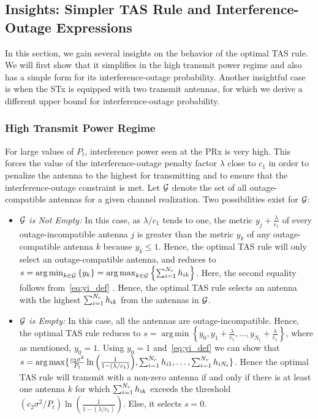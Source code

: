 \documentclass[12pt,draftcls,peerreview,onecolumn]{IEEEtran}
\DeclareMathOperator*{\argmin}{arg\,min}
\DeclareMathOperator*{\argmax}{arg\,max}
\newcommand{\lam}{\lambda}
\newcommand{\goodset}{\cal{G}}
\newcommand{\Nt}{{N_t}}
\newcommand{\Pt}{{P_t}}
\newcommand{\such}{h}
\newcommand{\hk}[1]{{\such_{#1}}}
\newcommand{\noisevar}{\sigma^2}
\newcommand{\cone}{c_{1}}
\newcommand{\ctwo}{c_{2}}
\newcommand{\m}{\cone}
\newcommand{\lambym}{\frac{\lam}{\m}}
\newcommand{\yk}[1]{y_{#1}}
\newcommand{\ykplambym}[1]{\yk{#1}+\lambym}
\newcommand{\al}{\ctwo}
\newcommand{\igamma}{{\frac{\al\noisevar}{\Pt}\ln\left(\frac{1}{1-\left(\lam/\m\right) }\right)}}
\newcommand{\igammainline}{{\left( {\al\noisevar}/{\Pt}\right) \ln\left(\frac{1}{1-\left(\lam/\m\right) }\right)}}
\begin{document}
%
%

\subsection{Insights: Simpler TAS Rule and Interference-Outage Expressions}
In this section, we gain several insights on the behavior of the optimal TAS rule. We will first show that it simplifies in the high transmit power regime and also has a simple form for its interference-outage probability. Another insightful case is when the STx is equipped with two transmit antennas, for which we derive a different upper bound for interference-outage probability.  
%
\subsubsection{High Transmit Power Regime}
\label{sec:high_power}
For large values of $\Pt$, interference power seen at the PRx is very high. This forces the value of the interference-outage penalty factor $\lam$ close to $\cone$ in order to penalize the antenna to the highest for transmitting and to ensure that the interference-outage constraint is met. Let $\goodset$ denote the set of all outage-compatible antennas for a given channel realization. Two possibilities exist for $\goodset$: 

\begin{itemize}
	\item {\em $\goodset$ is Not Empty:} In this case, as $\lam/\m$ tends to one, the metric $\ykplambym{j}$ of every outage-incompatible antenna $j$ is greater than the metric $\yk{k}$ of any outage-compatible antenna $k$ because $\yk{k}\leq 1$. Hence, the optimal TAS rule will only select an outage-compatible antenna, and  reduces to $s=\argmin_{k\in\goodset} \left\{ \yk{k} \right\} = \argmax_{k\in\goodset} \left\{ \sumnr \hk{ik} \right\}$. Here, the second equality follows from~\eqref{eq:yi_def} . Hence, the optimal TAS rule selects an antenna with the highest $\sumnr \hk{ik}$ from the antennas in $\goodset$. 
	
	\item {\em $\goodset$ is Empty:} In this case, all the antennas are outage-incompatible. Hence, the optimal TAS rule reduces to $s= \argmin\left\{\yk{0},\ykplambym{1},\ldots,\ykplambym{\Nt}\right\}$, where as mentioned, $\yk{0}=1$. Using $\yk{0}=1$ and~\eqref{eq:yi_def} we can show that $s=\arg\max\{\igamma,\sumnr \hk{i1},\dots,\sumnr\hk{i\Nt}\}$. Hence the optimal TAS rule will transmit with a non-zero antenna if and only if there is at least one antenna $k$ for which $\sumnr \hk{ik}$ exceeds the threshold  $\igammainline$. Else, it selects $s=0$.
\end{itemize}
\end{document}
